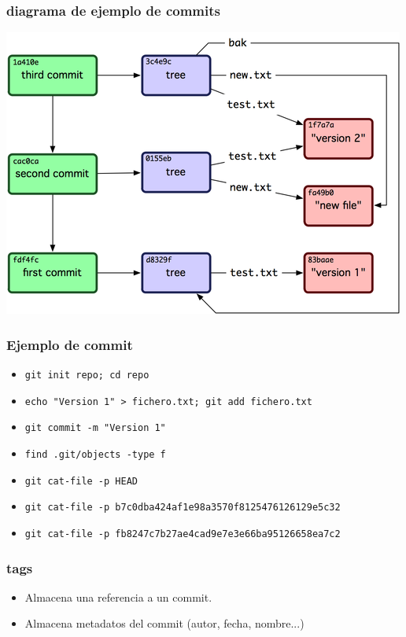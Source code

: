 \documentclass[10pt]{beamer}
\begin{document}
  \begin{frame}[containsverbatim]
    \frametitle{diagrama de ejemplo de commits}
    \begin{center}\includegraphics{commits.png}\end{center}
  \end{frame}

  \begin{frame}[containsverbatim]
    \frametitle{Ejemplo de commit}
    \begin{itemize}
        \item \verb$git init repo; cd repo$
        \item \verb$echo "Version 1" > fichero.txt; git add fichero.txt$
        \item \verb$git commit -m "Version 1"$
        \item \verb$find .git/objects -type f$
        \item \verb$git cat-file -p HEAD$
        \item \verb$git cat-file -p b7c0dba424af1e98a3570f8125476126129e5c32$
        \item \verb$git cat-file -p fb8247c7b27ae4cad9e7e3e66ba95126658ea7c2$
    \end{itemize}
  \end{frame}

  \begin{frame}[containsverbatim]
    \frametitle{tags}
    \begin{itemize}
        \item Almacena una referencia a un commit.
        \item Almacena metadatos del commit (autor, fecha, nombre...)
    \end{itemize}
  \end{frame}
\end{document}
